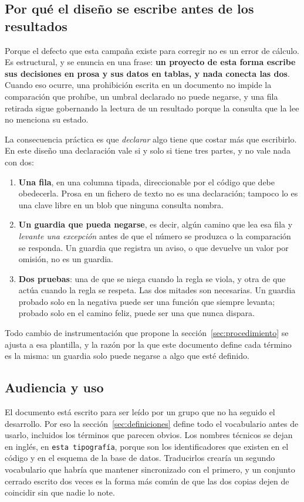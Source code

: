 \subsection{Por qué el diseño se escribe antes de los resultados}

Porque el defecto que esta campaña existe para corregir no es un error de
cálculo. Es estructural, y se enuncia en una frase: \textbf{un proyecto de esta
forma escribe sus decisiones en prosa y sus datos en tablas, y nada conecta las
dos}. Cuando eso ocurre, una prohibición escrita en un documento no impide la
comparación que prohíbe, un umbral declarado no puede negarse, y una fila
retirada sigue gobernando la lectura de un resultado porque la consulta que la
lee no menciona su estado.

La consecuencia práctica es que \emph{declarar} algo tiene que costar más que
escribirlo. En este diseño una declaración vale si y solo si tiene tres partes,
y no vale nada con dos:

\begin{enumerate}[leftmargin=1.5em,itemsep=0.25em]
  \item \textbf{Una fila}, en una columna tipada, direccionable por el código
        que debe obedecerla. Prosa en un fichero de texto no es una
        declaración; tampoco lo es una clave libre en un blob que ninguna
        consulta nombra.
  \item \textbf{Un guardia que pueda negarse}, es decir, algún camino que lea
        esa fila y \emph{levante una excepción} antes de que el número se
        produzca o la comparación se responda. Un guardia que registra un aviso,
        o que devuelve un valor por omisión, no es un guardia.
  \item \textbf{Dos pruebas}: una de que se niega cuando la regla se viola, y
        otra de que actúa cuando la regla se respeta. Las dos mitades son
        necesarias. Un guardia probado solo en la negativa puede ser una
        función que siempre levanta; probado solo en el camino feliz, puede ser
        una que nunca dispara.
\end{enumerate}

Todo cambio de instrumentación que propone la sección~\ref{sec:procedimiento}
se ajusta a esa plantilla, y la razón por la que este documento define cada
término es la misma: un guardia solo puede negarse a algo que esté definido.

\subsection{Audiencia y uso}

El documento está escrito para ser leído por un grupo que no ha seguido el
desarrollo. Por eso la sección~\ref{sec:definiciones} define todo el
vocabulario antes de usarlo, incluidos los términos que parecen obvios. Los
nombres técnicos se dejan en inglés, en \texttt{\small esta tipografía}, porque son los
identificadores que existen en el código y en el esquema de la base de datos.
Traducirlos crearía un segundo vocabulario que habría que mantener sincronizado
con el primero, y un conjunto cerrado escrito dos veces es la forma más común de
que las dos copias dejen de coincidir sin que nadie lo note.

